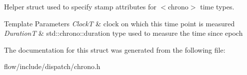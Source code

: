 Helper struct used to specify stamp attributes for $<$chrono$>$ time types. 


\begin{DoxyTemplParams}{Template Parameters}
{\em ClockT} & clock on which this time point is measured \\
\hline
{\em DurationT} & {\ttfamily std\+::chrono\+::duration} type used to measure the time since epoch \\
\hline
\end{DoxyTemplParams}


The documentation for this struct was generated from the following file\+:\begin{DoxyCompactItemize}
\item 
flow/include/dispatch/chrono.\+h\end{DoxyCompactItemize}
